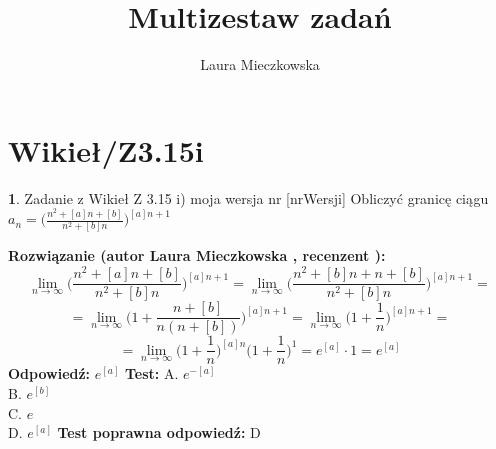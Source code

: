 \documentclass[12pt, a4paper]{article}
\title{Multizestaw zadań}
\author{Laura Mieczkowska}
\date{}
\theoremstyle{definition} %
\newtheorem{zad}{}
\newcommand{\kategoria}[1]{\section{#1}} %
\newcommand{\zadStart}[1]{\begin{zad}#1\newline} %
\newcommand{\zadStop}{\end{zad}}   %
\newcommand{\rozwStart}[2]{\noindent \textbf{Rozwiązanie (autor #1 , recenzent #2): }\newline} %
\newcommand{\odpStart}{\noindent \textbf{Odpowiedź:}\newline}    %
\newcommand{\odpStop}{\newline}                                             %
\newcommand{\testStart}{\noindent \textbf{Test:}\newline} %
\newcommand{\testStop}{\newline} %
\newcommand{\kluczStart}{\noindent \textbf{Test poprawna odpowiedź:}\newline} %
\newcommand{\kluczStop}{\newline} %
\begin{document}
\maketitle


\kategoria{Wikieł/Z3.15i}
\zadStart{Zadanie z Wikieł Z 3.15 i) moja wersja nr [nrWersji]}
Obliczyć granicę ciągu $a_n=\big(\frac{n^2+[a]n+[b]}{n^2+[b]n}\big)^{[a]n+1}$
\zadStop
\rozwStart{Laura Mieczkowska}{}
$$\lim_{n\to\infty}\bigg(\frac{n^2+[a]n+[b]}{n^2+[b]n}\bigg)^{[a]n+1}=
\lim_{n\to\infty} \bigg(\frac{n^2+[b]n+n+[b]}{n^2+[b]n}\bigg)^{[a]n+1}=$$
$$=\lim_{n\to\infty} \bigg(1+\frac{n+[b]}{n(n+[b])}\bigg)^{[a]n+1}=
\lim_{n\to\infty} \bigg(1+\frac{1}{n}\bigg)^{[a]n+1}=$$
$$=\lim_{n\to\infty} \bigg(1+\frac{1}{n}\bigg)^{[a]n}\bigg(1+\frac{1}{n}\bigg)^{1}=
e^{[a]}\cdot1=e^{[a]}$$
\odpStart
$e^{[a]}$
\odpStop
\testStart
A. $e^{-[a]}$ \\
B. $e^{[b]}$ \\
C. $e$ \\
D. $e^{[a]}$ 
\testStop
\kluczStart
D
\kluczStop
\end{document}
